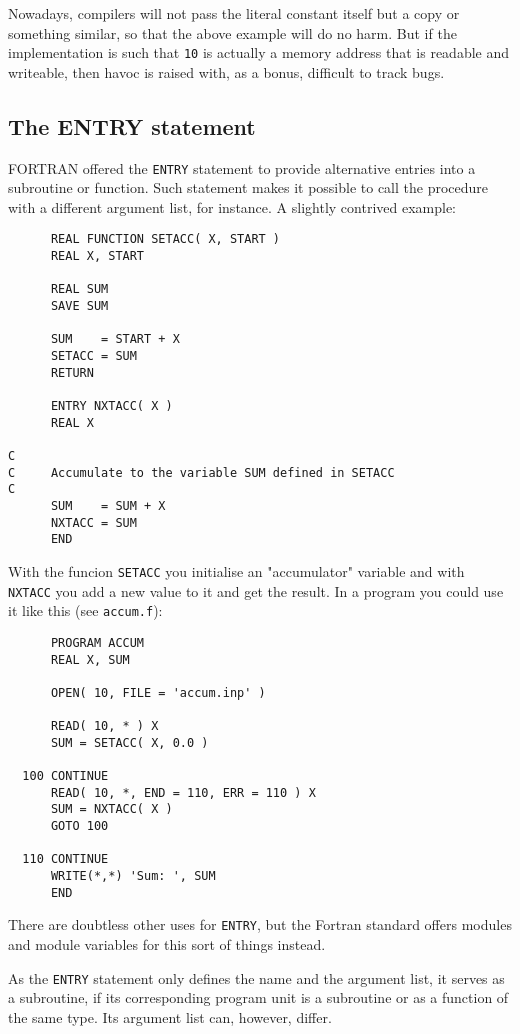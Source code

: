 Nowadays, compilers will not pass the literal constant itself but a copy or something similar, so that
the above example will do no harm. But if the implementation is such that \verb+10+
is actually a memory address that is readable and writeable, then havoc is raised with, as
a bonus, difficult to track bugs.


\subsection{The ENTRY statement}
FORTRAN offered the \verb+ENTRY+ statement to provide alternative entries into a subroutine or function.
Such statement makes it possible to call the procedure with a different argument list, for instance.
A slightly contrived example:
\begin{verbatim}
      REAL FUNCTION SETACC( X, START )
      REAL X, START

      REAL SUM
      SAVE SUM

      SUM    = START + X
      SETACC = SUM
      RETURN

      ENTRY NXTACC( X )
      REAL X

C
C     Accumulate to the variable SUM defined in SETACC
C
      SUM    = SUM + X
      NXTACC = SUM
      END
\end{verbatim}

With the funcion \verb+SETACC+ you initialise an "accumulator" variable and with \verb+NXTACC+
you add a new value to it and get the result. In a program you could use it like this (see \verb+accum.f+):
\begin{verbatim}
      PROGRAM ACCUM
      REAL X, SUM

      OPEN( 10, FILE = 'accum.inp' )

      READ( 10, * ) X
      SUM = SETACC( X, 0.0 )

  100 CONTINUE
      READ( 10, *, END = 110, ERR = 110 ) X
      SUM = NXTACC( X )
      GOTO 100

  110 CONTINUE
      WRITE(*,*) 'Sum: ', SUM
      END
\end{verbatim}

There are doubtless other uses for \verb+ENTRY+, but the Fortran standard offers modules and module
variables for this sort of things instead.

As the \verb+ENTRY+ statement only defines the name and the argument list, it serves as a subroutine,
if its corresponding program unit is a subroutine or as a function of the same type. Its argument list
can, however, differ.

